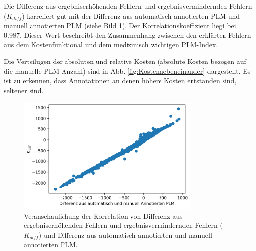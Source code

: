 \begin{table}[!ht]
\label{tab:Kostenbeiträge}
\end{table}


Die Differenz aus ergebniserhöhenden Fehlern und ergebnisvermindernden Fehlern ($K_{diff}$) korreliert gut mit der Differenz aus automatisch annotierten PLM und manuell annotierten PLM (siehe Bild \ref{fig:plotKorr}). Der Korrelationskoeffizient liegt bei 0.987. Dieser Wert beschreibt den Zusammenhang zwischen den erklärten Fehlern aus dem Kostenfunktional und dem medizinisch wichtigen PLM-Index.


Die Verteilugen der absoluten und relative Kosten (absolute Kosten bezogen auf die manuelle PLM-Anzahl) sind in Abb. \ref{fig:Kostennebeneinander} dargestellt. Es ist zu erkennen, dass Annotationen an denen höhere Kosten entstanden sind, seltener sind. 

\begin{figure}[!ht]%
	\begin{center}
	\includegraphics[width=0.80\textwidth]{./Bilder/korre.png}
	\end{center}
	\caption{Veranschaulichung der Korrelation von Differenz aus ergebniserhöhenden Fehlern und ergebnisvermindernden Fehlern ($K_{diff}$) und Differenz aus automatisch annotierten und manuell annotierten PLM.}%
	\label{fig:plotKorr}%
\end{figure}

